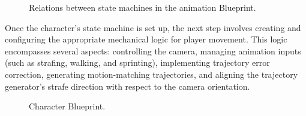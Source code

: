 \documentclass[12pt]{book}
\begin{document}
\begin{figure}[!h]
    \centering
    \caption{Relations between state machines in the animation Blueprint.}
   \end{figure}
Once the character's state machine is set up, the next step involves creating and configuring the appropriate mechanical logic for player movement. This logic encompasses several aspects: controlling the camera, managing animation inputs (such as strafing, walking, and sprinting), implementing trajectory error correction, generating motion-matching trajectories, and aligning the trajectory generator's strafe direction with respect to the camera orientation.
   \begin{figure}[!h]
    \centering
    \caption{Character Blueprint.}
   \end{figure}
\end{document}

